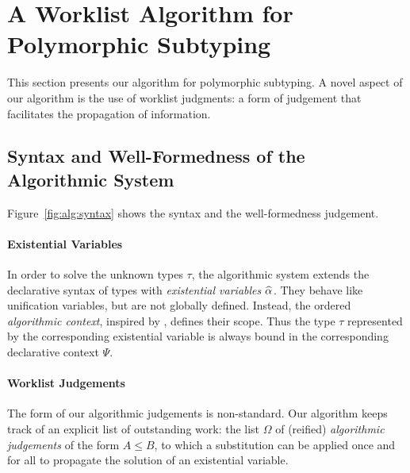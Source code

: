 \section{A Worklist Algorithm for Polymorphic Subtyping}\label{algorithmic_subtyping}

This section presents our algorithm for polymorphic
subtyping. A novel aspect of our algorithm is the use of worklist
judgments: a form of judgement that facilitates the propagation 
of information. 


\subsection{Syntax and Well-Formedness of the Algorithmic System}
Figure~\ref{fig:alg:syntax} shows the
syntax and the well-formedness judgement.  

\paragraph{Existential Variables}
In order to solve the unknown types $\tau$, the algorithmic system extends the
declarative syntax of types with \emph{existential variables} $\al$.  They
behave like unification variables, but are not globally defined. Instead, the
ordered \emph{algorithmic context}, inspired by \citet{dunfield2013complete},
defines their scope. Thus 
the type $\tau$ represented by the corresponding existential variable is
always bound in the corresponding declarative context $\Psi$.

\paragraph{Worklist Judgements} The form of our algorithmic judgements is
non-standard. 
Our algorithm keeps track of an explicit list of
outstanding work: the list $\Omega$ of (reified) \emph{algorithmic judgements} 
of the form $A \leq B$,
to which a substitution can be applied once and for all to propagate the solution
of an existential variable. 

